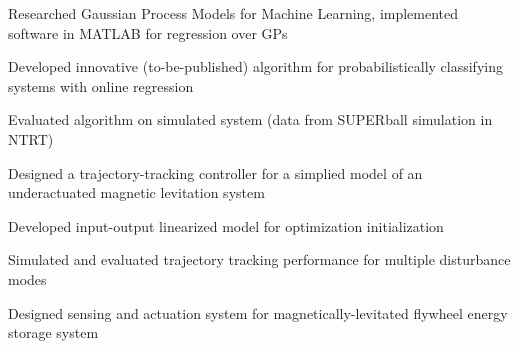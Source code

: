\documentclass[letterpaper]{deedy-resume} %
\begin{document}
\begin{minipage}[t]{1\textwidth}
\begin{tightitemize}
\item Researched Gaussian Process Models for Machine Learning, implemented software in MATLAB for regression over GPs

\item Developed innovative (to-be-published) algorithm for probabilistically classifying systems with online regression

\item Evaluated algorithm on simulated system (data from SUPERball simulation in NTRT)

\end{tightitemize}

\sectionspace %



\begin{tightitemize}

\item Designed a trajectory-tracking controller for a simplied model of an underactuated magnetic levitation system

\item Developed input-output linearized model for optimization initialization

\item Simulated and evaluated trajectory tracking performance for multiple disturbance modes

\end{tightitemize}

\sectionspace %




\vspace{\topsep} %
\begin{tightitemize}

\item Designed sensing and actuation system for magnetically-levitated flywheel energy storage system


\end{tightitemize}
\end{minipage}
\end{document}

